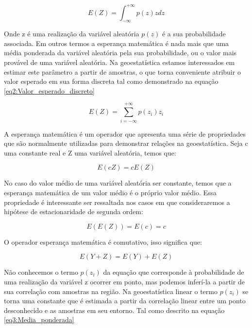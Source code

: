 \begin{equation}\label{eq1:Valor_esperado}
E\left(Z\right)= \int_{-\infty}^{+\infty} p\left(z\right)zdz
\end{equation}

Onde z é uma realização da variável aleatória $p(z)$ é a sua probabilidade associada. Em outros termos a esperança matemática é nada mais que uma média ponderada da variável aleatória pela sua probabilidade, ou o valor mais provável de uma variável aleatória. Na geoestatística estamos interessados em estimar este parâmetro a partir de amostras, o que torna conveniente atribuir o valor esperado em sua forma discreta tal como demonstrado na equação \eqref{eq2:Valor_esperado_discreto}

\begin{equation}\label{eq2:Valor_esperado_discreto}
	E\left(Z\right)= \sum_{i=-\infty}^{+\infty}p\left(z_i\right)z_i
\end{equation}

A esperança matemática é um operador que apresenta uma série de propriedades que são normalmente utilizadas para demonstrar relações na geoestatística. Seja c uma constante real e Z uma variável aleatória, temos que:

\begin{equation}\label{eq3:Propesperancamatematica}
E\left(cZ\right)= cE\left(Z\right)
\end{equation}

No caso do valor médio de uma variável aleatória ser constante, temos que a esperança matemática de um valor médio é o próprio valor médio. Essa propriedade é interessante ser ressaltada nos casos em que consideraremos a hipótese de estacionaridade de segunda ordem: 

\begin{equation}\label{eq4:Propesperancamatematica2}
E\left( E(Z) \right)= E(c) = c
\end{equation}

O operador esperança matemática é comutativo, isso significa que:

\begin{equation}\label{eq5:Propesperancamatematica3}
E\left( Y +  Z\right)= E(Y) + E(Z)
\end{equation}


Não conhecemos o termo $p\left(z_i\right)$ da equação que corresponde à probabilidade de uma realização da variável z ocorrer em ponto, mas podemos inferí-la a partir de sua correlação com amostras na região. Na geoestatística linear o termo $p\left(z_i\right)$ se torna uma constante que é estimada a partir da correlação linear entre um ponto desconhecido e as amostras em seu entorno. Tal como descrito na equação \eqref{eq3:Media_ponderada}

